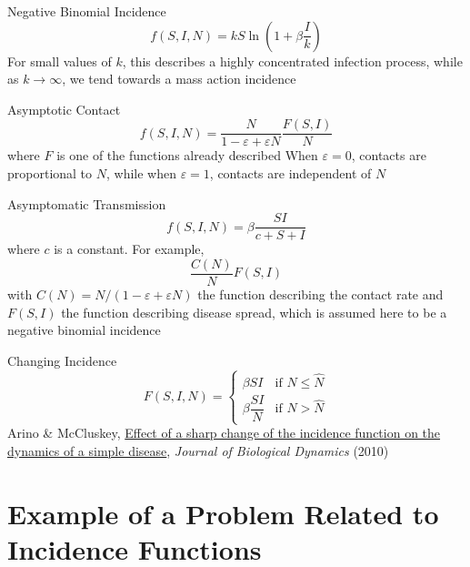 \documentclass[aspectratio=169]{beamer}\usepackage[]{graphicx}\usepackage[]{xcolor}
\begin{document}
\begin{frame}{Negative Binomial Incidence}
\begin{equation}
\tag{6}
f(S,I,N)=kS\ln\left(1+\beta\frac{I}{k}\right)
\end{equation}
\bbullet For small values of $k$, this describes a highly concentrated infection process, while as $k\to\infty$, we tend towards a mass action incidence
\end{frame}

\begin{frame}{Asymptotic Contact}
\begin{equation}
\tag{7}
f(S,I,N)
=\frac{N}{1-\varepsilon+\varepsilon N}
\frac{F(S,I)}{N}
\end{equation}
where $F$ is one of the functions already described
\vfill
\bbullet When $\varepsilon=0$, contacts are proportional to $N$, while when $\varepsilon=1$, contacts are independent of $N$
\end{frame}

\begin{frame}{Asymptomatic Transmission}
\begin{equation}
\tag{8}
f(S,I,N)
=\beta\frac{SI}{c+S+I}
\end{equation}
where $c$ is a constant. For example, 
\[
\frac{C(N)}{N} F(S,I)
\]
with $C(N)=N/(1-\varepsilon+\varepsilon N)$ the function describing the contact rate and $F(S,I)$ the function describing disease spread, which is assumed here to be a negative binomial incidence
\end{frame}

\begin{frame}{Changing Incidence}
\begin{equation}
\tag{9}
F(S,I,N) = 
\begin{cases}
\beta SI & \textrm{if }N\leq \hat{N} \\
\beta \dfrac{SI}{N} & \textrm{if }N> \hat{N}
\end{cases}
\end{equation}
\vfill
\bbullet Arino \& McCluskey, \href{https://doi.org/10.1080/17513751003793017}{Effect of a sharp change of the incidence function on the dynamics of a simple disease}, \emph{Journal of Biological Dynamics} (2010)
\end{frame}

\section{Example of a Problem Related to Incidence Functions}
\end{document}
